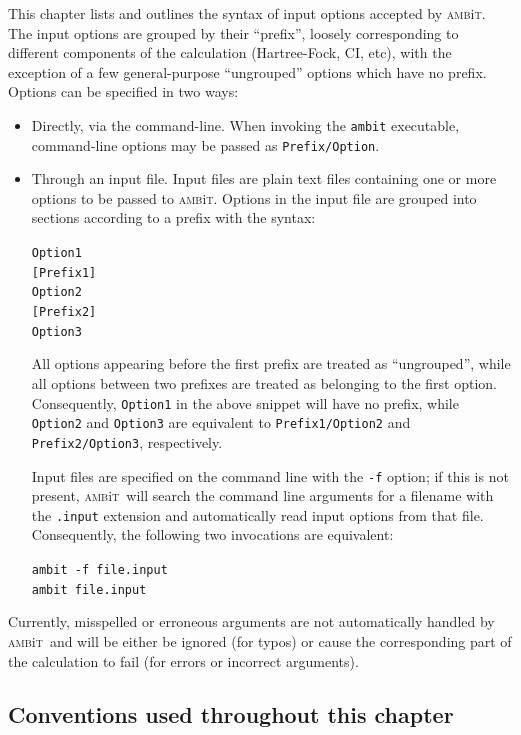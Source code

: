 \documentclass{report}
\newcommand{\ambit}{\textsc{amb}{\footnotesize i}\textsc{t}}
\begin{document}
This chapter lists and outlines the syntax of input options accepted by \ambit. The input options are
grouped by their ``prefix'', loosely corresponding to different components of the calculation
(Hartree-Fock, CI, etc), with the exception of a few general-purpose ``ungrouped'' options which have no
prefix. Options can be specified in two ways:
\begin{itemize}
\item Directly, via the command-line. When invoking the \texttt{ambit} executable, command-line options 
may be passed as \texttt{Prefix/Option}.
\item Through an input file. Input files are plain text files containing one or more options to be
passed to \ambit. Options in the input file are grouped into sections according to a prefix with the
syntax:

\texttt{Option1}
\smallskip\\
\texttt{[Prefix1]}\\
\texttt{Option2}
\smallskip\\
\texttt{[Prefix2]}\\
\texttt{Option3}

All options appearing before the first prefix are treated as ``ungrouped'', while all options between
two prefixes are treated as belonging to the first option. Consequently, \texttt{Option1} in the above
snippet will have no prefix, while \texttt{Option2} and \texttt{Option3} are equivalent to
\texttt{Prefix1/Option2} and \texttt{Prefix2/Option3}, respectively.

Input files are specified on the command line with the \texttt{-f} option; if this is not present,
\ambit\ will search the command line arguments for a filename with the \texttt{.input} extension and
automatically read input options from that file. Consequently, the following two invocations are
equivalent:

\texttt{ambit -f file.input}\\
\texttt{ambit file.input}
\end{itemize}

Currently, misspelled or erroneous arguments are not automatically handled by \ambit\ 
and will be either be ignored (for typos) or cause the corresponding part of the calculation to fail 
(for errors or incorrect arguments).

\subsection{Conventions used throughout this chapter}
\end{document}
